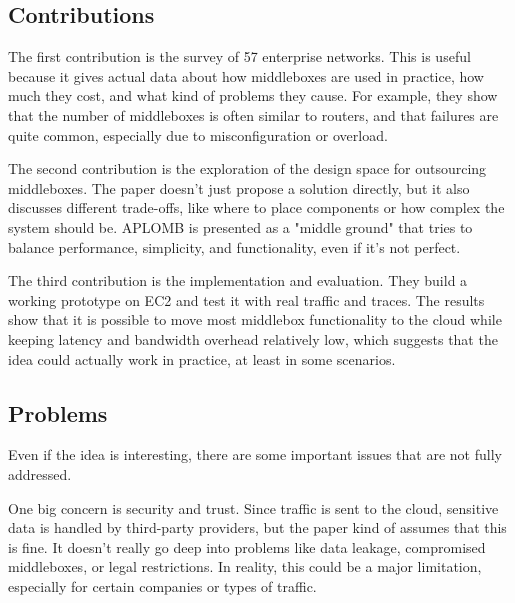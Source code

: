 \documentclass[a4paper, 12pt]{article}
\begin{document}
\subsection{Contributions}

The first contribution is the survey of 57 enterprise networks. This is useful because it gives actual data about how middleboxes are used in practice, how much they cost, and what kind of problems they cause. For example, they show that the number of middleboxes is often similar to routers, and that failures are quite common, especially due to misconfiguration or overload.

The second contribution is the exploration of the design space for outsourcing middleboxes. The paper doesn't just propose a solution directly, but it also discusses different trade-offs, like where to place components or how complex the system should be. APLOMB is presented as a "middle ground" that tries to balance performance, simplicity, and functionality, even if it's not perfect.

The third contribution is the implementation and evaluation. They build a working prototype on EC2 and test it with real traffic and traces. The results show that it is possible to move most middlebox functionality to the cloud while keeping latency and bandwidth overhead relatively low, which suggests that the idea could actually work in practice, at least in some scenarios.

\subsection{Problems}

Even if the idea is interesting, there are some important issues that are not fully addressed.

One big concern is security and trust. Since traffic is sent to the cloud, sensitive data is handled by third-party providers, but the paper kind of assumes that this is fine. It doesn't really go deep into problems like data leakage, compromised middleboxes, or legal restrictions. In reality, this could be a major limitation, especially for certain companies or types of traffic.
\end{document}
